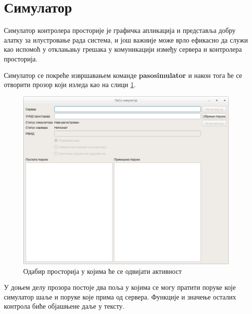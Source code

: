 \documentclass[a4paper, 12pt, diplomski]{etfcyr}
\begin{document}
		\section{Симулатор}
			\begin{justify}
				Симулатор контролера просторије је графичка апликација и представља добру алатку за илустровање рада система, и још важније може врло ефикасно да служи као испомоћ у отклањању грешака у комуникацији између сервера и контролера просторија.

				Симулатор се покреће извршавањем команде \textbf{pasosimulator} и након тога ће се отворити прозор који изледа као на слици \ref{figure:simulator_main_window}.
				\begin{figure}[h]
					\begin{center}
						\includegraphics[width=1.0\textwidth]{manual/simulator_main_window.png}
					\end{center}
					\caption{Одабир просторија у којима ће се одвијати активност}
					\label{figure:simulator_main_window}
				\end{figure}
				У доњем делу прозора постоје два поља у којима се могу пратити поруке које симулатор шаље и поруке које прима од сервера. Функције и значење осталих контрола биће објашњене даље у тексту.


\end{justify}
\end{document}
